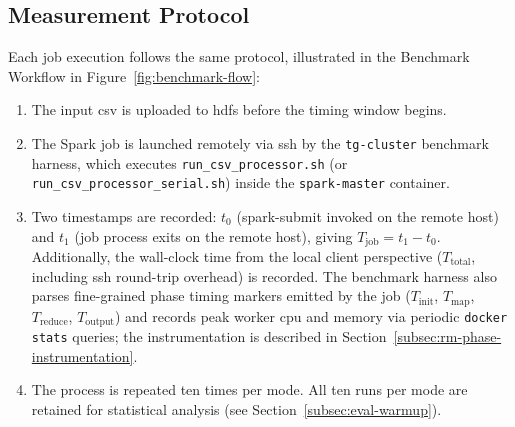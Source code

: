 \subsection{Measurement Protocol}
\label{subsec:eval-protocol}

Each job execution follows the same protocol, illustrated in the Benchmark Workflow in
Figure~\ref{fig:benchmark-flow}:

\begin{enumerate}
    \item The input \gls{csv} is uploaded to \gls{hdfs} before the timing window begins.
    \item The Spark job is launched remotely via \gls{ssh} by the \texttt{tg-cluster}
          benchmark harness, which executes \texttt{run\_csv\_processor.sh} (or
          \texttt{run\_csv\_processor\_serial.sh}) inside the
          \texttt{spark-master} container.
    \item Two timestamps are recorded: $t_0$ (spark-submit invoked on the
          remote host) and $t_1$ (job process exits on the remote host), giving
          $T_{\text{job}} = t_1 - t_0$.  Additionally, the wall-clock time
          from the local client perspective ($T_{\text{total}}$, including
          \gls{ssh} round-trip overhead) is recorded.  The benchmark harness also
          parses fine-grained phase timing markers emitted by the job
          ($T_{\text{init}}$, $T_{\text{map}}$, $T_{\text{reduce}}$, $T_{\text{output}}$)
          and records peak worker \gls{cpu} and memory via periodic \texttt{docker stats}
          queries; the instrumentation is described in
          Section~\ref{subsec:rm-phase-instrumentation}.
    \item The process is repeated ten times per mode.
          All ten runs per mode are retained for statistical analysis (see
          Section~\ref{subsec:eval-warmup}).
\end{enumerate}

